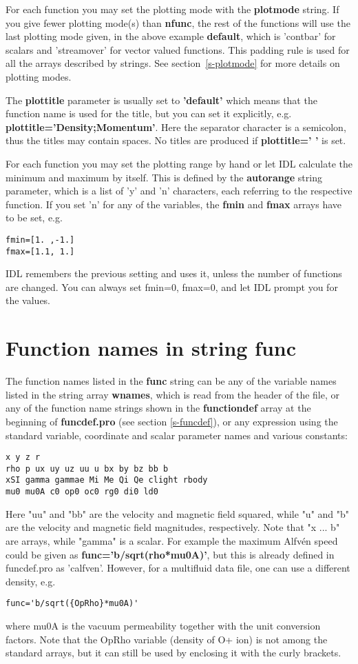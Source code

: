 \documentclass{article}
\begin{document}
For each function you may set the plotting mode with the {\bf plotmode} string.
If you give fewer plotting mode(s) than {\bf nfunc}, the rest of
the functions will use the last plotting mode given, in the above example
{\bf default}, which is 'contbar' for scalars and 'streamover' for vector valued
functions. This padding rule is used for all the arrays described 
by strings. See section~\ref{s-plotmode} for more details on plotting modes.

The {\bf plottitle} parameter is usually set to {\bf 'default'} which
means that the function name is used for the title, but you can set it
explicitly, e.g. {\bf plottitle='Density;Momentum'}. Here the 
separator character is a semicolon, thus the titles may contain spaces.
No titles are produced if {\bf plottitle=' '} is set.

For each function you may set the plotting range by hand or let IDL
calculate the minimum and maximum by itself. This is defined by
the {\bf autorange} string parameter, which is a list of 'y' and 'n'
characters, each referring to the respective function. If you set 'n'
for any of the variables, the {\bf fmin} and {\bf fmax} arrays have
to be set, e.g.
\begin{verbatim}
fmin=[1. ,-1.]
fmax=[1.1, 1.]
\end{verbatim}
IDL remembers the previous setting and uses it, unless the number
of functions are changed. You can always set fmin=0, fmax=0, and let
IDL prompt you for the values.

\section{Function names in string func \label{s-functions}}

The function names listed in the {\bf func} string can be any of 
the variable names listed in the string array {\bf wnames}, which is 
read from the header of the file, or any of the function name strings 
shown in the {\bf functiondef} array at the beginning of
{\bf funcdef.pro} (see section \ref{s-funcdef}), 
or any expression using the standard variable, 
coordinate and scalar parameter names and various constants:
\begin{verbatim}
x y z r
rho p ux uy uz uu u bx by bz bb b
xSI gamma gammae Mi Me Qi Qe clight rbody
mu0 mu0A c0 op0 oc0 rg0 di0 ld0
\end{verbatim}
Here "uu" and "bb" are the velocity and magnetic field squared, while
"u" and "b" are the velocity and magnetic field magnitudes, 
respectively. Note that "x ... b" are arrays, while  "gamma" is
a scalar.  For example the maximum Alfv\'en 
speed could be given as {\bf func='b/sqrt(rho*mu0A)'}, but this is already 
defined in funcdef.pro as 'calfven'. However, for a multifluid data
file, one can use a different density, e.g. 
\begin{verbatim}
func='b/sqrt({OpRho}*mu0A)'
\end{verbatim}
where mu0A is the vacuum permeability together with the unit conversion
factors.
Note that the OpRho variable (density of O+ ion) is not among the standard
arrays, but it can still be used by enclosing it with the curly brackets.
\end{document}
